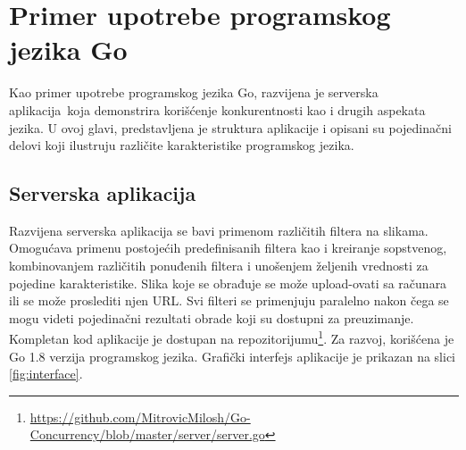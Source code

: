 \documentclass[12pt,oneside]{memoir}
\begin{document}

\chapter{Primer upotrebe programskog jezika Go}\label{app}

Kao primer upotrebe programskog jezika Go, razvijena je serverska aplikacija\ koja demonstrira korišćenje konkurentnosti kao i drugih aspekata jezika. U ovoj glavi, predstavljena je struktura aplikacije i opisani su pojedinačni delovi koji ilustruju različite karakteristike programskog jezika. 

\section{Serverska aplikacija}

Razvijena serverska aplikacija se bavi primenom različitih filtera na slikama. Omogućava primenu postojećih predefinisanih filtera kao i kreiranje sopstvenog, kombinovanjem različitih ponuđenih filtera i unošenjem željenih vrednosti za pojedine karakteristike. Slika koje se obrađuje se može upload-ovati sa računara ili se može proslediti njen URL. Svi filteri se primenjuju paralelno nakon čega se mogu videti pojedinačni rezultati obrade koji su dostupni za preuzimanje. Kompletan kod aplikacije je dostupan na repozitorijumu\footnote{\url{https://github.com/MitrovicMilosh/Go-Concurrency/blob/master/server/server.go}}. Za razvoj, korišćena je Go 1.8 verzija programskog jezika. Grafički interfejs aplikacije je prikazan na slici \ref{fig:interface}.
\end{document}
